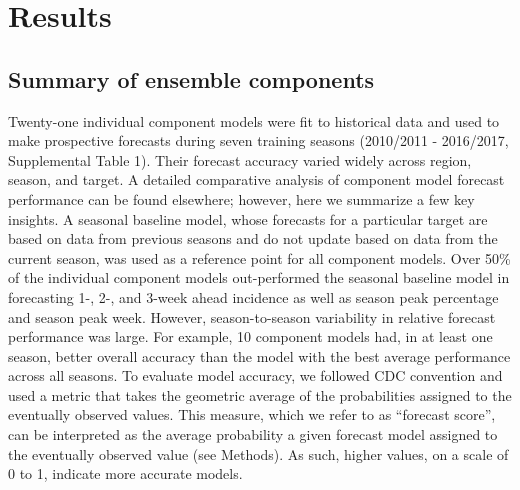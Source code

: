 \documentclass{article}\usepackage[]{graphicx}\usepackage[]{color}
\begin{document}
\section*{Results}

\subsection*{Summary of ensemble components} \label{subsec:comp-models}

%


Twenty-one individual component models were fit to historical data and used to make prospective forecasts during seven training seasons (2010/2011 - 2016/2017, Supplemental Table 1). 
Their forecast accuracy varied widely across region, season, and target.
A detailed comparative analysis of component model forecast performance can be found elsewhere\cite{reich2019collaborative}; however, here we summarize a few key insights.
A seasonal baseline model, whose forecasts for a particular target are based on data from previous seasons and do not update based on data from the current season, was used as a reference point for all component models.
Over 50\% of the individual component models out-performed the seasonal baseline model in forecasting 1-, 2-, and 3-week ahead incidence as well as season peak percentage and season peak week.
However, season-to-season variability in relative forecast performance was large.
For example, 10 component models had, in at least one season, better overall accuracy than the model with the best average performance across all seasons. 
To evaluate model accuracy, we followed CDC convention and used a metric that takes the geometric average of the probabilities assigned to the eventually observed values. 
This measure, which we refer to as ``forecast score'', can be interpreted as the average probability a given forecast model assigned to the eventually observed value  (see Methods).
As such, higher values, on a scale of 0 to 1, indicate more accurate models.

\end{document}

